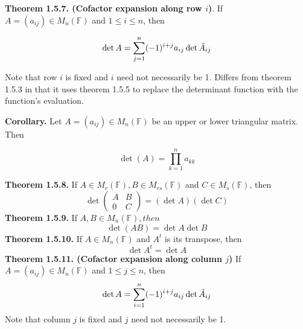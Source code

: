 \documentclass[10pt,landscape]{article}
\begin{document}
\begin{multicols}{4}







\textbf{Theorem 1.5.7. (Cofactor expansion along row $i$)}. If $A = (a_{ij}) \in M_n(\mathbb{F})$ and $1 \leq i \leq n$, then 

$$
\operatorname{det} A = \sum^n_{j = 1}(-1)^{i+j}a_{ij}\operatorname{det}\Tilde{A}_{ij}
$$

Note that row $i$ is fixed and $i$ need not necessarily be 1. Differs from theorem 1.5.3 in that it uses theorem 1.5.5 to replace the determinant function with the function's evaluation. 

\textbf{Corollary.} Let $A = (a_{ij}) \in M_n(\mathbb{F})$ be an upper or lower triangular matrix. Then

$$
\operatorname{det}(A) = \prod^n_{k=1} a_{kk} 
$$


\textbf{Theorem 1.5.8.} If $A \in M_r(\mathbb{F}), B \in M_{rs}(\mathbb{F})$ and $C \in M_s(\mathbb{F})$, then 
$$
\operatorname{det} 
\begin{pmatrix}
A & B \\
0 & C 
\end{pmatrix} = (\operatorname{det}A)(\operatorname{det}C)
$$
\textbf{Theorem 1.5.9.} If $A, B \in M_n(\mathbb{F}), then$
$$
\operatorname{det}(AB) = \operatorname{det}A\operatorname{det}B
$$
\textbf{Theorem 1.5.10.} If $A \in M_n(\mathbb{F})$ and $A^t$ is its transpose, then
$$
\operatorname{det}A^t = \operatorname{det} A
$$
\textbf{Theorem 1.5.11. (Cofactor expansion along column $j$)} If $A = (a_{ij}) \in M_n(\mathbb{F})$ and $1 \leq j \leq n$, then 
$$
\operatorname{det} A = \sum^n_{i = 1}(-1)^{i+j}a_{ij} \operatorname{det}\Tilde{A}_{ij}
$$
Note that column $j$ is fixed and $j$ need not necessarily be 1.


\end{multicols}
\end{document}
